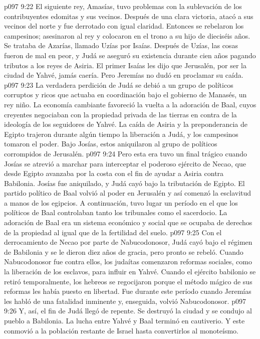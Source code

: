 \vs p097 9:22 El siguiente rey, Amasías, tuvo problemas con la sublevación de los contribuyentes edomitas y sus vecinos. Después de una clara victoria, atacó a sus vecinos del norte y fue derrotado con igual claridad. Entonces se rebelaron los campesinos; asesinaron al rey y colocaron en el trono a su hijo de dieciséis años. Se trataba de Azarías, llamado Uzías por Isaías. Después de Uzías, las cosas fueron de mal en peor, y Judá se aseguró su existencia durante cien años pagando tributos a los reyes de Asiria. El primer Isaías les dijo que Jerusalén, por ser la ciudad de Yahvé, jamás caería. Pero Jeremías no dudó en proclamar su caída.
\vs p097 9:23 \pc La verdadera perdición de Judá se debió a un grupo de políticos corruptos y ricos que actuaba en coordinación bajo el gobierno de Manasés, un rey niño. La economía cambiante favoreció la vuelta a la adoración de Baal, cuyos creyentes negociaban con la propiedad privada de las tierras en contra de la ideología de los seguidores de Yahvé. La caída de Asiria y la preponderancia de Egipto trajeron durante algún tiempo la liberación a Judá, y los campesinos tomaron el poder. Bajo Josías, estos aniquilaron al grupo de políticos corrompidos de Jerusalén.
\vs p097 9:24 Pero esta era tuvo un final trágico cuando Josías se atrevió a marchar para interceptar el poderoso ejército de Necao, que desde Egipto avanzaba por la costa con el fin de ayudar a Asiria contra Babilonia. Josías fue aniquilado, y Judá cayó bajo la tributación de Egipto. El partido político de Baal volvió al poder en Jerusalén y así comenzó la  esclavitud a manos de los egipcios. A continuación, tuvo lugar un período en el que los políticos de Baal controlaban tanto los tribunales como el sacerdocio. La adoración de Baal era un sistema económico y social que se ocupaba de derechos de la propiedad al igual que de la fertilidad del suelo.
\vs p097 9:25 Con el derrocamiento de Necao por parte de Nabucodonosor, Judá cayó bajo el régimen de Babilonia y se le dieron diez años de gracia, pero pronto se rebeló. Cuando Nabucodonosor fue contra ellos, los judaítas comenzaron reformas sociales, como la liberación de los esclavos, para influir en Yahvé. Cuando el ejército babilonio se retiró temporalmente, los hebreos se regocijaron porque el método mágico de sus reformas les había puesto en libertad. Fue durante este período cuando Jeremías les habló de una fatalidad inminente y, enseguida, volvió Nabucodonosor.
\vs p097 9:26 Y, así, el fin de Judá llegó de repente. Se destruyó la ciudad y se condujo al pueblo a Babilonia. La lucha entre Yahvé y Baal terminó en cautiverio. Y este conmovió a la población restante de Israel hasta convertirlos al monoteísmo.
